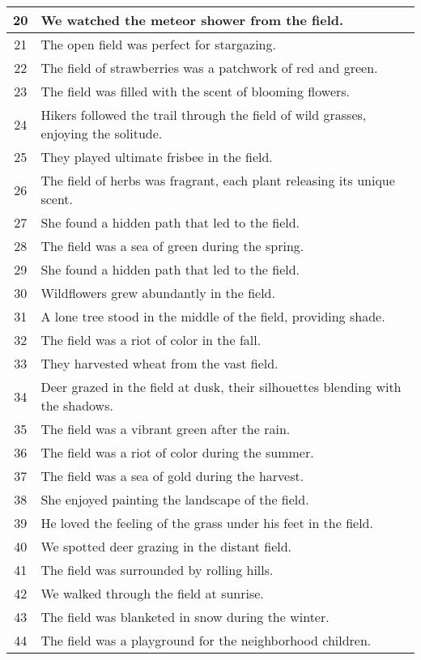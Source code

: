\begin{longtable}{|c|p{12cm}|}
20 & We watched the meteor shower from the field. \\ \hline
21 & The open field was perfect for stargazing. \\ \hline
22 & The field of strawberries was a patchwork of red and green. \\ \hline
23 & The field was filled with the scent of blooming flowers. \\ \hline
24 & Hikers followed the trail through the field of wild grasses, enjoying the solitude. \\ \hline
25 & They played ultimate frisbee in the field. \\ \hline
26 & The field of herbs was fragrant, each plant releasing its unique scent. \\ \hline
27 & She found a hidden path that led to the field. \\ \hline
28 & The field was a sea of green during the spring. \\ \hline
29 & She found a hidden path that led to the field. \\ \hline
30 & Wildflowers grew abundantly in the field. \\ \hline
31 & A lone tree stood in the middle of the field, providing shade. \\ \hline
32 & The field was a riot of color in the fall. \\ \hline
33 & They harvested wheat from the vast field. \\ \hline
34 & Deer grazed in the field at dusk, their silhouettes blending with the shadows. \\ \hline
35 & The field was a vibrant green after the rain. \\ \hline
36 & The field was a riot of color during the summer. \\ \hline
37 & The field was a sea of gold during the harvest. \\ \hline
38 & She enjoyed painting the landscape of the field. \\ \hline
39 & He loved the feeling of the grass under his feet in the field. \\ \hline
40 & We spotted deer grazing in the distant field. \\ \hline
41 & The field was surrounded by rolling hills. \\ \hline
42 & We walked through the field at sunrise. \\ \hline
43 & The field was blanketed in snow during the winter. \\ \hline
44 & The field was a playground for the neighborhood children. \\ \hline

\end{longtable}
